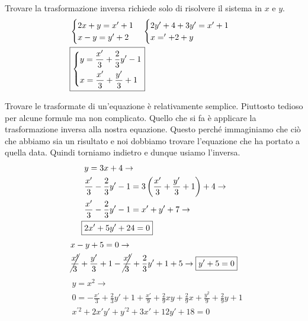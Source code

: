 Trovare la trasformazione inversa richiede solo di risolvere il sistema in $x$ e $y$.
\begin{align*}
  &\begin{cases}
  2x+y=x'+1\\
  x-y=y'+2
\end{cases}
\begin{cases}
  2y'+4+3y'=x'+1\\
  x='+2+y
\end{cases}\\
&\boxed{\begin{dcases}
y = \frac{x'}{3}+\frac{2}{3}y'-1\\
x = \frac{x'}{3}+\frac{y'}{3}+1
\end{dcases}}
\end{align*}


Trovare le trasformate di un'equazione è relativamente semplice. Piuttosto tedioso per alcune formule
ma non complicato. Quello che si fa è applicare la trasformazione inversa alla nostra equazione.
Questo perché immaginiamo che ciò che abbiamo sia un risultato e noi dobbiamo trovare l'equazione
che ha portato a quella data. Quindi torniamo indietro e dunque usiamo l'inversa.
\begin{align*}
  &y=3x+4 \rightarrow\\
  &\frac{x'}{3}-\frac{2}{3}y'-1=3\left(\frac{x'}{3}+\frac{y'}{3}+1\right)+4 \rightarrow\\
  &\frac{x'}{3}-\frac{2}{3}y'-1=x'+y'+7\rightarrow\\\Aboxed{&2x'+5y'+24=0}
\end{align*}
\begin{align*}
  &x-y+5=0\rightarrow\\
  &\cancel{\frac{x'}{3}}+\frac{y'}{3}+1-\cancel{\frac{x'}{3}}+\frac{2}{3}y'+1+5 \rightarrow
  \boxed{y'+5=0}
\end{align*}
\begin{align*}
  &y=x^2\rightarrow\\
  &0=-\frac{x'}{3}+\frac{2}{3}y'+1+\frac{x'}{9}+\frac{2}{9}xy+\frac{2}{9}x+\frac{y^2}{9}+\frac{2}{9}y+1
  \\ &\boxed{x^{'2}+2x'y'+y^{'2}+3x'+12y'+18=0}
\end{align*}

